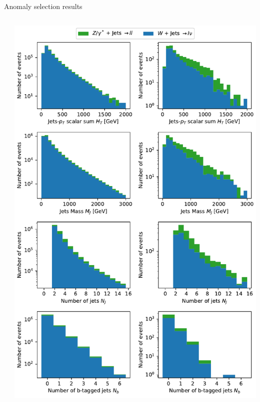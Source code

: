 \documentclass{beamer}
\begin{document}
\begin{frame}{Anomaly selection results}
\begin{columns}
\begin{column}{0.5\textwidth}
\begin{center}
     \end{center}
\end{column}
\begin{column}{0.5\textwidth}  %
    \begin{center}
     \includegraphics[width=1\textwidth]{mc_b.pdf}
     \end{center}
\end{column}
\end{columns}
\end{frame}
\end{document}
